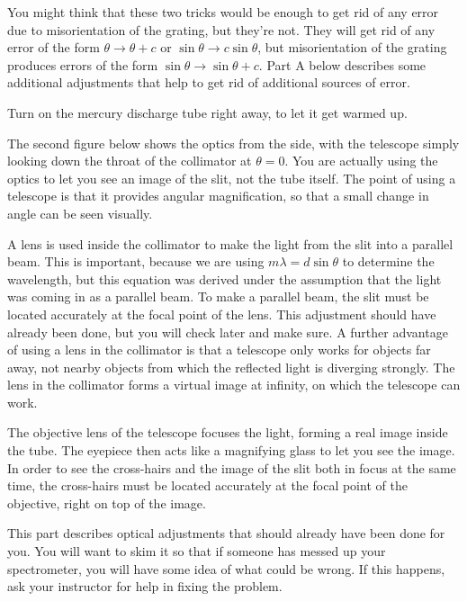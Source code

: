 You might think that these two tricks would be enough to get rid
of any error due to misorientation of the grating, but they're not.
They will get rid of any error of the form $\theta\rightarrow\theta+c$
or $\sin\theta\rightarrow c\sin\theta$, but misorientation of the grating
produces errors of the form $\sin\theta\rightarrow\sin\theta+c$.
Part A below describes some additional adjustments that help
to get rid of additional sources of error.

\observations

Turn on the mercury discharge tube right away, to let it get warmed up.

\setcounter{labpartctr}{0}


The second figure below shows the optics from the side, with the
telescope simply looking down the throat of the collimator
at $\theta=0$. You are actually using the optics to let you
see an image of the slit, not the tube itself. The point of
using a telescope is that it provides angular magnification,
so that a small change in angle can be seen visually.

A lens is used inside the collimator to make the light from
the slit into a parallel beam. This is important, because we
are using $m\lambda =d\sin\theta$ to determine the
wavelength, but this equation was derived under the
assumption that the light was coming in as a parallel beam.
To make a parallel beam, the slit must be located accurately
at the focal point of the lens. This adjustment should have
already been done, but you will check later and make sure. A
further advantage of using a lens in the collimator is that
a telescope only works for objects far away, not nearby
objects from which the reflected light is diverging
strongly.  The lens in the collimator forms a virtual image
at infinity, on which the telescope can work.

The objective lens of the telescope focuses the light,
forming a real image inside the tube. The eyepiece then acts
like a magnifying glass to let you see the image. In order
to see the cross-hairs and the image of the slit both in
focus at the same time, the cross-hairs must be located
accurately at the focal point of the objective, right
on top of the image.

\setup


This part describes optical adjustments that
should already have been done for you. You will want to skim it
so that if someone has messed up your spectrometer, you will have
some idea of what could be wrong. If this happens, ask your instructor
for help in fixing the problem.

